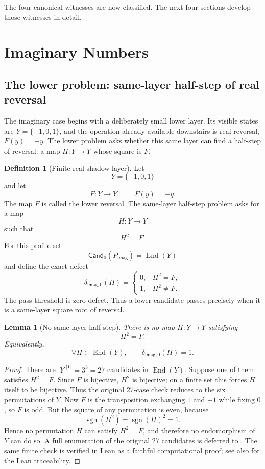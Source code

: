 \documentclass[11pt]{article}
\newcommand{\Imag}{\mathsf{Imag}}
\newcommand{\End}{\operatorname{End}}
\newtheorem{lemma}[theorem]{Lemma}
\theoremstyle{definition}
\newtheorem{definition}[theorem]{Definition}
\begin{document}
The four canonical witnesses are now classified.  The next four sections develop
those witnesses in detail.
 \section{Imaginary Numbers}\label{sec:imaginary}

\subsection{The lower problem: same-layer half-step of real reversal}
\label{subsec:imag-lower-problem}

The imaginary case begins with a deliberately small lower layer.  Its visible
states are \(Y=\{-1,0,1\}\), and the operation already available downstairs is
real reversal, \(F(y)=-y\).  The lower problem asks whether this same layer can
find a half-step of reversal: a map \(H:Y\to Y\) whose square is \(F\).

\begin{definition}[Finite real-shadow layer]
\label{def:imag-real-shadow-layer}
Let
\[
Y=\{-1,0,1\}
\]
and let
\[
F:Y\to Y,
\qquad
F(y)=-y.
\]
The map \(F\) is called the lower reversal.  The same-layer half-step problem asks for a map
\[
H:Y\to Y
\]
such that
\[
H^2=F.
\]
For this profile set
\[
\mathsf{Cand}_0(P_{\Imag})=\End(Y)
\]
and define the exact defect
\[
\delta_{\Imag,0}(H)
=
\begin{cases}
0,& H^2=F,\\
1,& H^2\neq F.
\end{cases}
\]
The pass threshold is zero defect.  Thus a lower candidate passes precisely when it is a same-layer square root of reversal.
\end{definition}

\begin{lemma}[No same-layer half-step]
\label{lem:imag-no-same-layer-root}
There is no map \(H:Y\to Y\) satisfying
\[
H^2=F.
\]
Equivalently,
\[
\forall H\in\End(Y),
\qquad
\delta_{\Imag,0}(H)=1.
\]
\end{lemma}

\begin{proof}
There are \(|Y|^{|Y|}=3^3=27\) candidates in \(\End(Y)\).  Suppose one of
them satisfies \(H^2=F\).  Since \(F\) is bijective, \(H^2\) is bijective; on
a finite set this forces \(H\) itself to be bijective.  Thus the original
27-case check reduces to the six permutations of \(Y\).  Now \(F\) is the
transposition exchanging \(1\) and \(-1\) while fixing \(0\), so \(F\) is odd.
But the square of any permutation is even, because
\[
\operatorname{sgn}(H^2)=\operatorname{sgn}(H)^2=1.
\]
Hence no permutation \(H\) can satisfy \(H^2=F\), and therefore no endomorphism
of \(Y\) can do so.  A full enumeration of the original 27 candidates is
deferred to .  The same finite check is verified in Lean as
a faithful computational proof; see also  for the Lean
traceability.
\end{proof}
\end{document}
